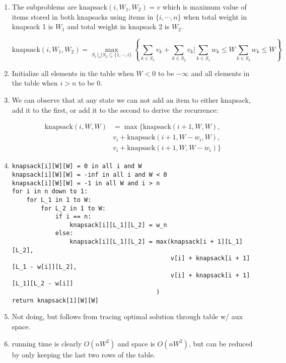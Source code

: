 \documentclass[11pt]{article}
\begin{document}
\begin{enumerate}
    \item The subproblems are $\text{knapsack}(i, W_1, W_2) = v$ which is maximum value of items stored in both knapsacks using items in $\{i, \cdots, n\}$ when total weight in knapsack 1 is $W_1$ and total weight in knapsack 2 is $W_2$.

          \[ \text{knapsack}(i, W_1, W_2) = \max_{S_1 \bigcup S_2 \subseteq \{1, \cdots, i\}} \left\{ \sum_{k \in S_1} v_k + \sum_{k \in S_2} v_k | \sum_{k \in S_1} w_k \leq W \sum_{k \in S_2} w_k \leq W \right\} \]

    \item Initialize all elements in the table when $W < 0$ to be $-\infty$ and all elements in the table when $i > n$ to be $0$.

    \item We can observe that at any state we can not add an item to either knapsack, add it to the first, or add it to the second to derive the recurrence:

          \begin{align*}
              \text{knapsack}(i, W, W) & = \max \{ \text{knapsack}(i + 1, W, W),     \\
                                       & v_i + \text{knapsack}(i + 1, W - w_i, W),   \\
                                       & v_i + \text{knapsack}(i + 1, W, W - w_i) \}
          \end{align*}

    \item

          \begin{verbatim}
knapsack[i][W][W] = 0 in all i and W
knapsack[i][W][W] = -inf in all i and W < 0
knapsack[i][W][W] = -1 in all W and i > n
for i in n down to 1:
    for L_1 in 1 to W:
        for L_2 in 1 to W:
            if i == n:
                knapsack[i][L_1][L_2] = w_n
            else:
                knapsack[i][L_1][L_2] = max(knapsack[i + 1][L_1][L_2],
                                            v[i] + knapsack[i + 1][L_1 - w[i]][L_2],
                                            v[i] + knapsack[i + 1][L_1][L_2 - w[i]]
                                        )
return knapsack[1][W][W]
\end{verbatim}

    \item Not doing, but follows from tracing optimal solution through table w/ aux space.

    \item running time is clearly $O(nW^2)$ and space is $O(nW^2)$, but can be reduced by only keeping the last two rows of the table.

\end{enumerate}
\end{document}
